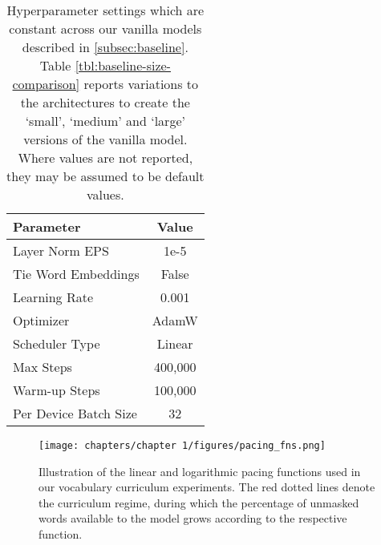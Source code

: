 \begin{table*}
    \centering
    \small
    \begin{tabular}{lc}
    \toprule
         Parameter& Value\\
    \midrule
         Layer Norm EPS& 1e-5 \\
         Tie Word Embeddings & False \\
         Learning Rate & 0.001 \\
         Optimizer & AdamW \\
         Scheduler Type & Linear\\
         Max Steps & 400,000 \\
         Warm-up Steps & 100,000\\
         Per Device Batch Size & 32 \\
    \bottomrule
    \end{tabular}
    \caption{Hyperparameter settings which are constant across our vanilla models described in \ref{subsec:baseline}. Table \ref{tbl:baseline-size-comparison} reports variations to the architectures to create the `small', `medium' and `large' versions of the vanilla model. Where values are not reported, they may be assumed to be default values.}
    \label{tbl:baseline_hyperparams}
\end{table*}
\begin{figure*}
\centering
\texttt{[image: chapters/chapter 1/figures/pacing\_fns.png]}
    \caption{Illustration of the linear and logarithmic pacing functions used in our vocabulary curriculum experiments. The red dotted lines denote the curriculum regime, during which the percentage of unmasked words available to the model grows according to the respective function.}
    \label{fig:pacing_fn}
\end{figure*}
